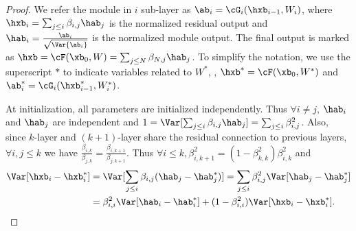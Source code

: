\begin{proof}

We refer the module in $i$ sub-layer as $\ab_i = \cG_i(\hxb_{i-1}, W_i)$, where $\hxb_{i} = \sum_{j\leq i} \beta_{i, j} \hab_j$ is the normalized residual output and $\hab_i = \frac{\ab_i}{\sqrt{\Var{\ab_i}}}$ is the normalized module output. 
The final output is marked as $\hxb = \cF(\xb_0, W) = \sum_{j\leq N} \beta_{N, j} \hab_j$.
To simplify the notation, we use the superscript $*$ to indicate variables related to $W^*$, \eg, $\hxb^* = \cF(\xb_0, W^*)$ and $\ab_i^* = \cG_i(\hxb^*_{i-1}, W^*_i)$.

At initialization, all parameters are initialized independently.
Thus $\forall i \neq j$, $\hab_i$ and $\hab_j$ are independent and $1 = \Var[\sum_{j\le i} \beta_{i, j}\hab_j] = \sum_{j \le i} \beta_{i, j}^2$. 
Also, since $k$-layer and $(k+1)$-layer share the residual connection to previous layers, $\forall i, j \leq k$ we have $\frac{\beta_{i, k}}{\beta_{j, k}} = \frac{\beta_{i, k+1}}{\beta_{j, k+1}}$.
Thus $\forall i \leq k, \beta^2_{i, k + 1} = (1 - \beta^2_{k, k}) \beta^2_{i, k}$ and 
\begin{align}
\Var[\hxb_i - \hxb^*_i] & = \Var[\sum_{j \leq i} \beta_{i, j} (\hab_j - \hab_j^*)] = \sum_{j \leq i} \beta^2_{i, j} \Var[\hab_j - \hab_j^*] \nonumber\\
& = \beta^2_{i, i} \Var[\hab_i - \hab_i^*] + (1 - \beta^2_{i, i}) \Var[\hxb_i - \hxb^*_i]. \label{eqn:recurrent}
\end{align}


\end{proof}
